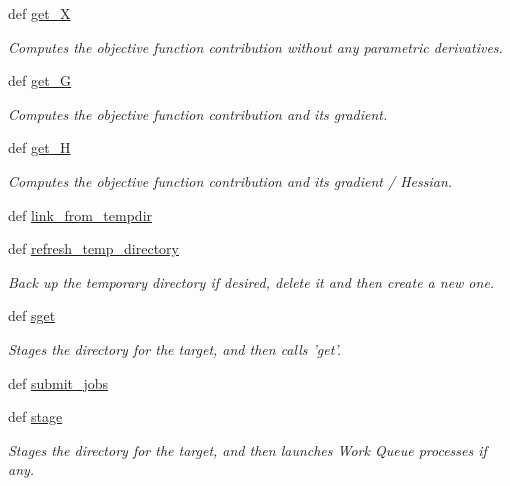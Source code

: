 \begin{DoxyCompactItemize}
def \hyperlink{classforcebalance_1_1target_1_1Target_a606dd136f195c267c05a2455405e5949}{get\-\_\-\-X}
\begin{DoxyCompactList}\small\item\em \-Computes the objective function contribution without any parametric derivatives. \end{DoxyCompactList}\item 
def \hyperlink{classforcebalance_1_1target_1_1Target_afa8cc38c8bba8861c072e789717aa049}{get\-\_\-\-G}
\begin{DoxyCompactList}\small\item\em \-Computes the objective function contribution and its gradient. \end{DoxyCompactList}\item 
def \hyperlink{classforcebalance_1_1target_1_1Target_a1d2ee27fe86a09769c1816af23b09adb}{get\-\_\-\-H}
\begin{DoxyCompactList}\small\item\em \-Computes the objective function contribution and its gradient / \-Hessian. \end{DoxyCompactList}\item 
def \hyperlink{classforcebalance_1_1target_1_1Target_a5aa4958cea0a48138511567a076c5a82}{link\-\_\-from\-\_\-tempdir}
\item 
def \hyperlink{classforcebalance_1_1target_1_1Target_afe815eafab06ac92f10bbf4b88ad95c8}{refresh\-\_\-temp\-\_\-directory}
\begin{DoxyCompactList}\small\item\em \-Back up the temporary directory if desired, delete it and then create a new one. \end{DoxyCompactList}\item 
def \hyperlink{classforcebalance_1_1target_1_1Target_a51d58b55242bf4d4909c1837174f5f3c}{sget}
\begin{DoxyCompactList}\small\item\em \-Stages the directory for the target, and then calls 'get'. \end{DoxyCompactList}\item 
def \hyperlink{classforcebalance_1_1target_1_1Target_a78cd29b94cbcc201eed99c78aaef46a4}{submit\-\_\-jobs}
\item 
def \hyperlink{classforcebalance_1_1target_1_1Target_af8d2a4658c87841e40296795aec478bb}{stage}
\begin{DoxyCompactList}\small\item\em \-Stages the directory for the target, and then launches \-Work \-Queue processes if any. \end{DoxyCompactList}\item 

\end{DoxyCompactItemize}
